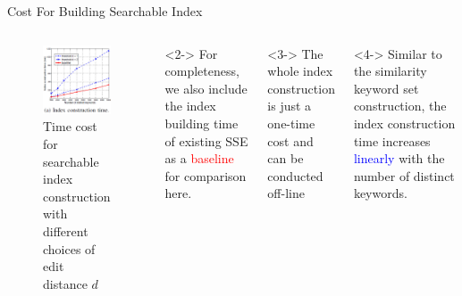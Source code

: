 \documentclass[handout]{beamer}
\begin{document}
\begin{frame}{Cost For Building Searchable Index}
    \begin{columns}
	\begin{figure}
		\includegraphics[width=\textwidth]{subfig2.jpg}
		\caption{Time cost for searchable index construction with different choices of edit distance $d$}
	\end{figure}
	    \begin{alertblock}<2->{}
	    	For completeness, we also include the index building time of existing SSE as a \textcolor{red}{baseline} for comparison here.
	    \end{alertblock}
	    \begin{exampleblock}<3->{}
	    	The whole index construction is just a one-time cost and can be conducted off-line
	    \end{exampleblock}
	\begin{block}<4->{}
		Similar to the similarity keyword set construction, the index construction time increases \textcolor{blue}{linearly} with the number of distinct keywords.
	\end{block}
	\end{columns}
\end{frame}
\end{document}
